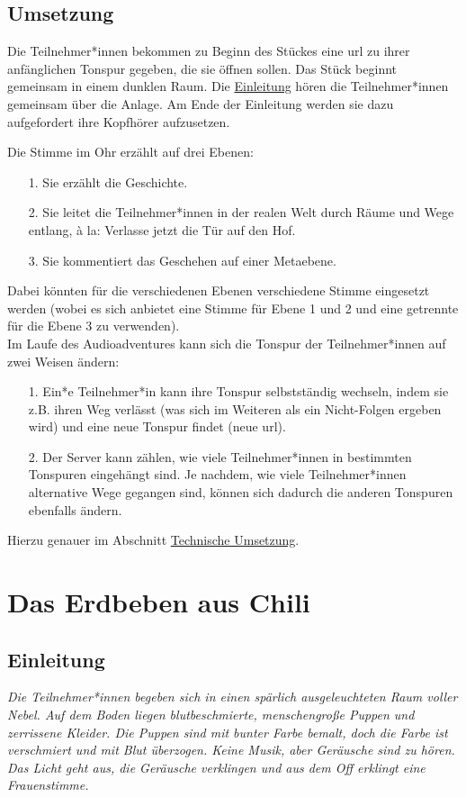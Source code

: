 \documentclass[a4paper, 12pt]{report}
\newcommand\mainmatter{ \cleardoublepage \pagenumbering{arabic}}
\begin{document}
\section*{Umsetzung}
Die Teilnehmer*innen bekommen zu Beginn des Stückes eine url zu ihrer anfänglichen Tonspur gegeben, die sie öffnen sollen.
Das Stück beginnt gemeinsam in einem dunklen Raum.
Die \hyperref[einleitung]{Einleitung} hören die Teilnehmer*innen gemeinsam über die Anlage.
Am Ende der Einleitung werden sie dazu aufgefordert ihre Kopfhörer aufzusetzen.

Die \glqq Stimme im Ohr\grqq{} erzählt auf drei Ebenen:
\begin{itemize}
    \item[1.] Sie erzählt die Geschichte.
    \item[2.] Sie leitet die Teilnehmer*innen in der \glqq realen Welt\grqq{} durch Räume und Wege entlang, à la: \glqq Verlasse jetzt die Tür auf den Hof\grqq .
    \item[3.] Sie kommentiert das Geschehen auf einer Metaebene.
\end{itemize}
Dabei könnten für die verschiedenen Ebenen verschiedene Stimme eingesetzt werden (wobei es sich anbietet eine Stimme für Ebene 1 und 2 und eine getrennte für die Ebene 3 zu verwenden).\\

Im Laufe des Audioadventures kann sich die Tonspur der Teilnehmer*innen auf zwei Weisen ändern:
\begin{itemize}
    \item[1.] Ein*e Teilnehmer*in kann ihre Tonspur selbstständig wechseln, indem sie z.B. ihren Weg verlässt (was sich im Weiteren als ein Nicht-Folgen ergeben wird) und eine neue Tonspur findet (neue url).
    \item[2.] Der Server kann zählen, wie viele Teilnehmer*innen in bestimmten Tonspuren \glqq eingehängt\grqq{} sind. Je nachdem, wie viele Teilnehmer*innen alternative Wege gegangen sind, können sich dadurch die anderen Tonspuren ebenfalls ändern.
\end{itemize}
Hierzu genauer im Abschnitt \hyperref[technische_umsetzung]{Technische Umsetzung}.

\tableofcontents
\mainmatter
\chapter{Das Erdbeben aus Chili}

\section{Einleitung}\label{einleitung}
\textit{Die Teilnehmer*innen begeben sich in einen spärlich ausgeleuchteten Raum voller Nebel. 
Auf dem Boden liegen blutbeschmierte, menschengroße Puppen und zerrissene Kleider. 
Die Puppen sind mit bunter Farbe bemalt, doch die Farbe ist verschmiert und mit Blut überzogen. Keine Musik, aber Geräusche sind zu hören. 
Das Licht geht aus, die Geräusche verklingen und aus dem Off erklingt eine Frauenstimme.}\\
\end{document}
